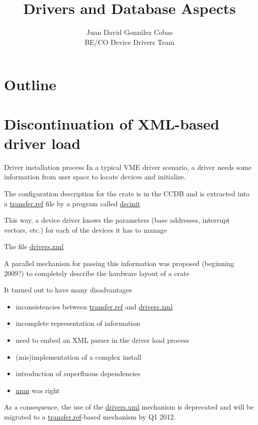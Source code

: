 \documentclass[compress,red]{beamer}
\title{Drivers and Database Aspects}
\author{Juan David Gonz\'alez Cobas\\
	BE/CO Device Drivers Team}
\begin{document}
\begin{frame}
\titlepage
\end{frame}

\section*{Outline}
\begin{frame}
\tableofcontents
\end{frame}

\section{Discontinuation of XML-based driver load}

\begin{frame}{Driver installation process}
In a typical VME driver scenario, a driver needs some information from
user space to locate devices and initialize.

The configuration description for the crate is in the CCDB and is
extracted into a \url{transfer.ref} file by a program called
\url{dscinit}

This way, a device driver knows the parameters (base addresses,
interrupt vectors, etc.) for each of the devices it has to manage
\end{frame}

\begin{frame}{The file \url{drivers.xml}}

A parallel mechanism for passing this information was proposed
(beginning 2009?) to completely describe the hardware layout of a crate

It turned out to have many disadvantages

\begin{itemize}
\item inconsistencies between \url{transfer.ref} and \url{drivers.xml}
\item incomplete representation of information
\item need to embed an XML parser in the driver load process
\item (mis)implementation of a complex install
\item introduction of superfluous dependencies
\item \url{nmn} was right
\end{itemize}

As a consequence, the use of the \url{drivers.xml} mechanism is
deprecated and will be migrated to a \url{transfer.ref}-based
mechanism by Q1 2012.
\end{frame}
\end{document}
